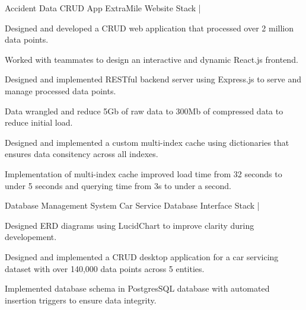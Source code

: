 \begin{cventries}
    \cventry
    {Accident Data CRUD App} %
    {ExtraMile Website} %
    {\href{https://github.com/giathuan123/extramile}{\faGithubSquare}} %
    {Stack | \diExpressOriginal \diReactPlainWordmark \diNodejsPlain \diPythonPlain } %
    {
        \begin{cvitems} %
        \item Designed and developed a CRUD web application that processed over 2 million data points.
        \item Worked with teammates to design an interactive and dynamic React.js frontend.
        \item Designed and implemented RESTful backend server using Express.js to serve and manage processed data points.
        \item Data wrangled and reduce 5Gb of raw data to 300Mb of compressed data to reduce initial load.
        \item Designed and implemented a custom multi-index cache using dictionaries that ensures data consitency across all indexes.
        \item Implementation of multi-index cache improved load time from 32 seconds to under 5 seconds and querying time from 3s to under a second.
        \end{cvitems}
    }
    \cventry
    {Database Management System} %
    {Car Service Database Interface} %
    {\href{https://github.com/giathuan123/cs166-project}{\faGithubSquare}} %
    {Stack | \diJavaPlain \diPostgresqlPlain } %
    {
        \begin{cvitems} %
        \item Designed ERD diagrams using LucidChart to improve clarity during developement.
        \item Designed and implemented a CRUD desktop application for a car servicing dataset with over 140,000 data points across 5 entities.
        \item Implemented database schema in PostgresSQL database with automated insertion triggers to ensure data integrity.

\end{cvitems}}
\end{cventries}
